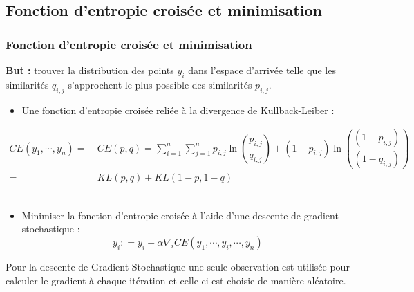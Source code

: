 \documentclass{beamer}
\theoremstyle{definition}
\begin{document}
\subsection{Fonction d'entropie croisée et minimisation}
\begin{frame}
	\frametitle{Fonction d'entropie croisée et minimisation}

	\textcolor{modernvert}{\textbf{But :}} trouver la distribution des points $y_i$ dans l'espace d'arrivée telle que les similarités $q_{i,j}$ s'approchent le plus possible des similarités $p_{i,j}$.
	\begin{itemize}
		\item Une fonction d’entropie croisée reliée à la divergence de Kullback-Leiber : 
		
	\end{itemize}
\begin{align*}
	CE(y_1,\cdots,y_n) =& \ CE(p,q) = \sum_{i=1}^{n}\sum_{j=1}^{n}p_{i,j}\ln\left(\dfrac{p_{i,j}}{q_{i,j}}\right) + (1-p_{i,j})\ln\left(\dfrac{(1-p_{i,j})}{(1 - q_{i,j})}\right)\\
	=&\  KL(p,q) + KL(1-p,1-q)
\end{align*}\quad\\[-0.25cm]
\begin{itemize}
		
		\item Minimiser la fonction d'entropie croisée à l'aide d'une descente de gradient stochastique :\\[-0.25cm]
		
		$$y_i : = y_i -\alpha \nabla_iCE (y_1,\cdots,y_i,\cdots,y_n)$$
		 
	\end{itemize}
	
		Pour la descente de Gradient Stochastique une seule observation est utilisée pour calculer le gradient à chaque itération et celle-ci est choisie de manière aléatoire.
	
\end{frame}
\end{document}
